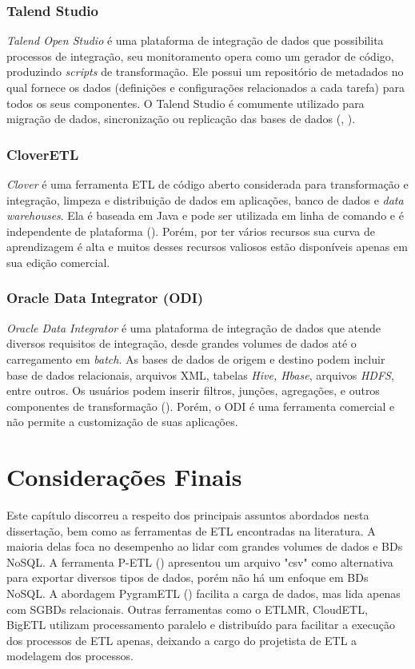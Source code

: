 \subsubsection{Talend Studio}

\textit{Talend Open Studio} é uma plataforma de integração de dados que possibilita processos de integração, seu monitoramento opera como um gerador de código, produzindo \textit{scripts} de transformação. Ele possui um repositório de metadados no qual fornece os dados (definições e configurações relacionados a cada tarefa) para todos os seus componentes. O Talend Studio é comumente utilizado para migração de dados, sincronização ou replicação das bases de dados  (\cite{mali:2015}, \cite{ETLtools}). 

\subsubsection{CloverETL}

\textit{Clover} é uma ferramenta ETL de código aberto considerada para transformação e integração, limpeza e distribuição de dados em aplicações, banco de dados e \textit{data warehouses}. Ela é baseada em Java e pode ser utilizada em linha de comando e é independente de plataforma (\cite{mali:2015}). Porém, por ter vários recursos sua curva de aprendizagem é alta e muitos desses recursos valiosos estão disponíveis apenas em sua edição comercial.

\subsubsection{Oracle Data Integrator (ODI)}

\textit{Oracle Data Integrator} é uma plataforma de integração de dados que atende diversos requisitos de integração, desde grandes volumes de dados até o carregamento em \textit{batch}. As bases de dados de origem e destino podem incluir base de dados relacionais, arquivos XML, tabelas \textit{Hive, Hbase}, arquivos \textit{HDFS}, entre outros. Os usuários podem inserir filtros, junções, agregações, e outros componentes de transformação (\cite{silva:2016}). Porém, o ODI é uma ferramenta comercial e não permite a customização de suas aplicações.

\section{Considerações Finais}

Este capítulo discorreu a respeito dos principais assuntos abordados nesta dissertação, bem como as ferramentas de ETL encontradas na literatura. A maioria delas foca no desempenho ao lidar com grandes volumes de dados e BDs NoSQL. A ferramenta P-ETL (\cite{bala:2014}) apresentou um arquivo "csv" como alternativa para exportar diversos tipos de dados, porém não há um enfoque em BDs NoSQL. A abordagem PygramETL (\cite{thomsen:2009}) facilita a carga de dados, mas lida apenas com SGBDs relacionais. Outras ferramentas como o ETLMR, CloudETL, BigETL utilizam processamento paralelo e distribuído para facilitar a execução dos processos de ETL apenas, deixando a cargo do projetista de ETL a modelagem dos processos.

